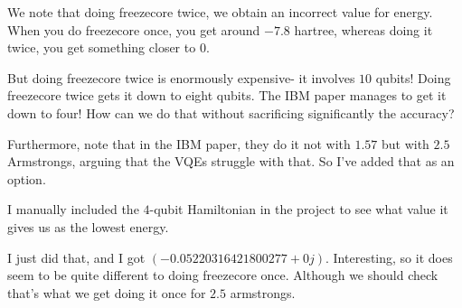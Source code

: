 \documentclass[]{article}
\title{}
\author{Sean Thrasher}
\theoremstyle{definition}
\begin{document}
\maketitle

\begin{abstract}

\end{abstract}

We note that doing freezecore twice, we obtain an incorrect value for energy. When you do freezecore once, you get around $ -7.8 $ hartree, whereas doing it twice, you get something closer to $ 0 $. 

But doing freezecore twice is enormously expensive- it involves $ 10 $ qubits! Doing freezecore twice gets it down to eight qubits. The IBM paper manages to get it down to four! How can we do that without sacrificing significantly the accuracy? 

Furthermore, note that in the IBM paper, they do it not with $ 1.57 $ but with $ 2.5 $ Armstrongs, arguing that the VQEs struggle with that. So I've added that as an option. 

I manually included the $ 4 $-qubit Hamiltonian in the project to see what value it gives us as the lowest energy. 

I just did that, and I got $ (-0.05220316421800277+0j) $. Interesting, so it does seem to be quite different to doing freezecore once. Although we should check that's what we get doing it once for $ 2.5 $ armstrongs. 

\printbibliography
\end{document}
